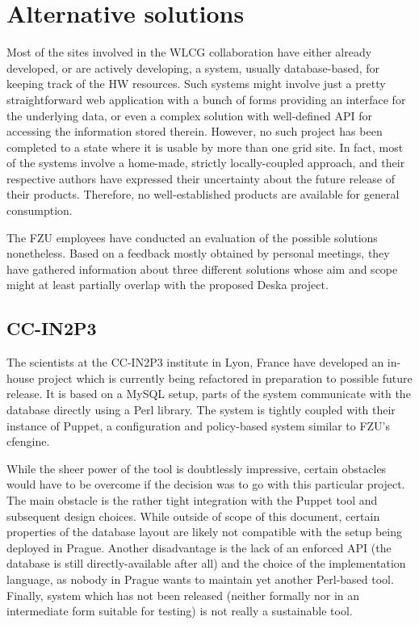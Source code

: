 \documentclass[12pt]{article}
\begin{document}
\section{Alternative solutions}
Most of the sites involved in the WLCG collaboration have either already developed, or are actively developing, a system, usually
database-based, for keeping track of the HW resources.  Such systems might involve just a pretty straightforward web application
with a bunch of forms providing an interface for the underlying data, or even a complex solution with well-defined API for
accessing the information stored therein.  However, no such project has been completed to a state where it is usable by more than
one grid site.  In fact, most of the systems involve a home-made, strictly locally-coupled approach, and their respective authors
have expressed their uncertainty about the future release of their products.  Therefore, no well-established products are
available for general consumption.

The FZU employees have conducted an evaluation of the possible solutions nonetheless.  Based on a feedback mostly obtained by
personal meetings, they have gathered information about three different solutions whose aim and scope might at least partially
overlap with the proposed Deska project.

\subsection{CC-IN2P3}
The scientists at the CC-IN2P3 institute in Lyon, France have developed an in-house project which is currently being refactored in
preparation to possible future release.  It is based on a MySQL setup, parts of the system communicate with the database directly
using a Perl library.  The system is tightly coupled with their instance of Puppet, a configuration and policy-based system
similar to FZU's cfengine.

While the sheer power of the tool is doubtlessly impressive, certain obstacles would have to be overcome if the decision was to go
with this particular project.  The main obstacle is the rather tight integration with the Puppet tool and subsequent design
choices.  While outside of scope of this document, certain properties of the database layout are likely not compatible with the
setup being deployed in Prague.  Another disadvantage is the lack of an enforced API (the database is still directly-available
after all) and the choice of the implementation language, as nobody in Prague wants to maintain yet another Perl-based tool.
Finally, system which has not been released (neither formally nor in an intermediate form suitable for testing) is not really a
sustainable tool.
\end{document}
